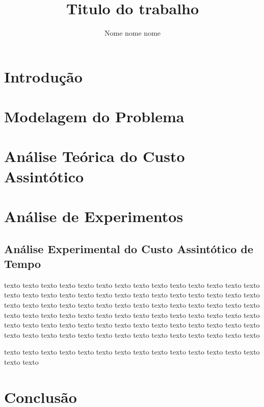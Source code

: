 \documentclass[a4paper,12pt]{article}
\begin{document}
  \title {Titulo do trabalho}
  \author {Nome nome nome}
  \maketitle
  \section {Introdução}
  \section {Modelagem do Problema}
  \section {Análise Teórica do Custo Assintótico}
  \section {Análise de Experimentos}
    \subsection {Análise Experimental do Custo Assintótico de Tempo}
    texto texto texto texto texto texto texto texto texto texto texto texto texto texto texto texto texto texto texto texto
    texto texto texto texto texto texto texto texto
    \newline
    texto texto texto texto texto texto texto texto texto texto texto texto texto texto texto texto texto texto texto texto
    texto texto texto texto texto texto texto texto texto texto texto texto texto texto texto texto texto texto texto texto
    texto texto texto texto texto texto texto texto
    texto texto texto texto texto texto texto texto
    \par
    texto texto texto texto texto texto texto texto
    texto texto texto texto texto texto texto texto
  \section {Conclusão}
\end{document}
